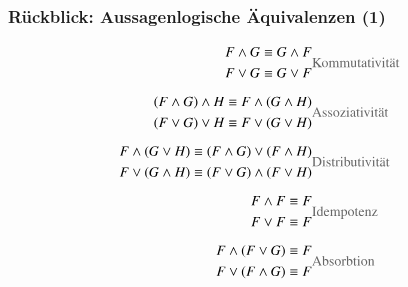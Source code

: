 \documentclass[aspectratio=1610,onlymath]{beamer}
\begin{document}
\begin{frame}\frametitle{Rückblick: Aussagenlogische Äquivalenzen (1)}

\begin{align*}
\begin{split}
F\wedge G & \equiv G\wedge F\\
F\vee G & \equiv G\vee F
\end{split}
		& \text{\textcolor{devilscss}{Kommutativität}} \\[1ex]
%
\begin{split}
(F\wedge G)\wedge H & \equiv F\wedge (G\wedge H)\\
(F\vee G)\vee H & \equiv F\vee (G\vee H)
\end{split}
		& \text{\textcolor{devilscss}{Assoziativität}} \\[1ex]
%
\begin{split}
F\wedge (G\vee H) & \equiv (F\wedge G) \vee (F\wedge H)\\
F\vee (G\wedge H) & \equiv (F\vee G)\wedge (F\vee H)
\end{split}
		& \text{\textcolor{devilscss}{Distributivität}} \\[1ex]
%
\begin{split}
F\wedge F & \equiv F\\
F\vee F & \equiv F
\end{split}
		& \text{\textcolor{devilscss}{Idempotenz}} \\[1ex]
%
\begin{split}
F\wedge (F\vee G) & \equiv F\\
F\vee (F\wedge G) & \equiv F
\end{split}
		& \text{\textcolor{devilscss}{Absorbtion}}
\end{align*}

\end{frame}
\end{document}
